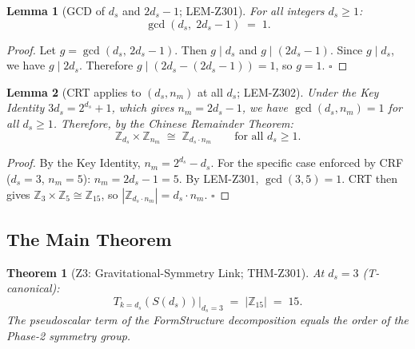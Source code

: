 \documentclass[12pt, a4paper]{article}
\newtheorem{theorem}{Theorem}[section]
\newtheorem{lemma}{Lemma}[section]
\begin{document}
\begin{lemma}[GCD of $d_s$ and $2d_s-1$; LEM-Z301]
\label{lem:gcd}
For all integers $d_s \geq 1$:
\begin{equation}
  \gcd(d_s,\; 2d_s - 1) \;=\; 1.
  \label{eq:gcd-lemma}
\end{equation}
\end{lemma}

\begin{proof}
Let $g = \gcd(d_s,\, 2d_s - 1)$. Then $g \mid d_s$ and
$g \mid (2d_s - 1)$. Since $g \mid d_s$, we have $g \mid 2d_s$.
Therefore $g \mid (2d_s - (2d_s-1)) = 1$, so $g = 1$. \hfill$\square$
\end{proof}

\begin{lemma}[CRT applies to $(d_s, n_m)$ at all $d_s$; LEM-Z302]
\label{lem:crt-apply}
Under the Key Identity $3d_s = 2^{d_s}+1$, which gives
$n_m = 2d_s - 1$, we have $\gcd(d_s, n_m) = 1$ for all $d_s \geq 1$.
Therefore, by the Chinese Remainder Theorem:
\begin{equation}
  \mathbb{Z}_{d_s} \times \mathbb{Z}_{n_m}
  \;\cong\; \mathbb{Z}_{d_s \cdot n_m}
  \qquad \text{for all } d_s \geq 1.
  \label{eq:crt}
\end{equation}
\end{lemma}

\begin{proof}
By the Key Identity, $n_m = 2^{d_s} - d_s$. For the specific
case enforced by CRF ($d_s=3$, $n_m = 5$): $n_m = 2d_s - 1 = 5$.
By LEM-Z301, $\gcd(3, 5) = 1$. CRT then gives
$\mathbb{Z}_3 \times \mathbb{Z}_5 \cong \mathbb{Z}_{15}$, so
$|\mathbb{Z}_{d_s \cdot n_m}| = d_s \cdot n_m$. \hfill$\square$
\end{proof}

\subsection{The Main Theorem}
\label{sec:theorem}

\begin{theorem}[Z3: Gravitational-Symmetry Link; THM-Z301]
\label{thm:Z3}
At $d_s = 3$ (T-canonical):
\begin{equation}
  \boxed{T_{k=d_s}(S(d_s))\big|_{d_s=3}
  \;=\; |\mathbb{Z}_{15}|
  \;=\; 15.}
  \label{eq:Z3-main}
\end{equation}
The pseudoscalar term of the FormStructure decomposition equals
the order of the Phase-2 symmetry group.
\end{theorem}
\end{document}
